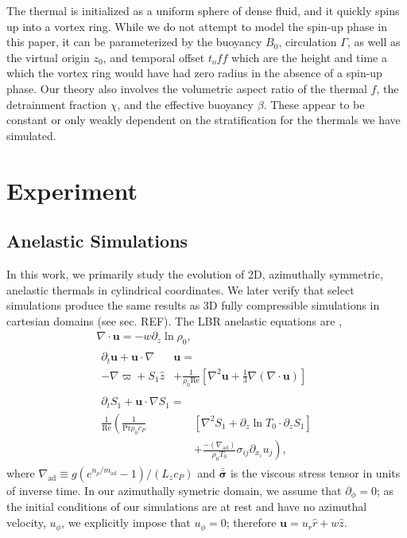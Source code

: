 \documentclass[twocolumn, amsmath, amsfonts, amssymb, trackchanges]{aastex62}
\newcommand{\DivU}{\ensuremath{\nabla\cdot\bm{u}}}
\newcommand{\grad}{\ensuremath{\nabla}}
\newcommand{\lilstressT}{\ensuremath{\bm{\bar{\bar{\sigma}}}}}
\begin{document}
The thermal is initialized as a uniform sphere of dense fluid, and it quickly spins up into a vortex ring. 
While we do not attempt to model the spin-up phase in this paper, it can be parameterized by the buoyancy $B_0$, circulation $\Gamma$, as well as the virtual origin $z_0$, and temporal offset $t_off$ which are the height and time a which the vortex ring would have had zero radius in the absence of a spin-up phase. 
Our theory also involves the volumetric aspect ratio of the thermal $f$, the detrainment fraction $\chi$, and the effective buoyancy $\beta$. 
These appear to be constant or only weakly dependent on the stratification for the thermals we have simulated.


\section{Experiment} 
\label{sec:experiment}


\subsection{Anelastic Simulations}
In this work, we primarily study the evolution of 2D, azimuthally symmetric, anelastic thermals in cylindrical coordinates. 
We later verify that select simulations produce the same results as 3D fully compressible simulations in cartesian domains (see sec. REF). 
The LBR anelastic equations are \citep{lecoanet&all2014},
\begin{gather}
\DivU = -w \partial_z \ln\rho_0, \\
\begin{split}
\partial_t \bm{u} + \bm{u}\cdot\grad&\bm{u} = \\
- \grad \varpi + S_1\hat{z} &
+ \frac{1}{\rho_0\text{Re}}\left[\grad^2 \bm{u} + \frac{1}{3}\grad(\DivU)\right] 
\end{split}\\
\begin{split}
\partial_t S_1 + \bm{u}\cdot\grad S_1 =& \\
\frac{1}{\text{Re}}\left(\frac{1}{\text{Pr}\rho_0c_P }\right.&[\grad^2 S_1 + \partial_z\ln T_0 \cdot\partial_z S_1]\\
&+ \left.\frac{-(\grad_{\text{ad}})}{\rho_0 T_0}\sigma_{ij}\partial_{x_i}u_j \right),
\end{split}
\end{gather}
where $\grad_{\text{ad}} \equiv g(e^{n_\rho/m_{\text{ad}}} - 1)/(L_z c_P)$ and $\lilstressT$ is the viscous stress tensor in units of inverse time.
In our azimuthally symetric domain, we assume that $\partial_\phi = 0$; as the initial conditions of our simulations are at rest and have no azimuthal velocity, $u_\phi$, we explicitly impose that $u_\phi = 0$; therefore $\bm{u} = u_r \hat{r} + w\hat{z}$. 
\end{document}
